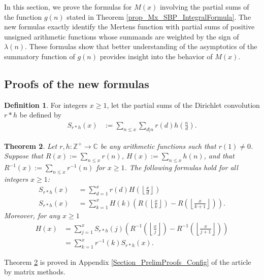 \documentclass[11pt,reqno,a4letter]{article}
\newcommand{\hlocalref}[1]{\hyperref[#1]{\ref{#1}}}
\numberwithin{equation}{section}
\numberwithin{figure}{section}
\numberwithin{table}{section}
\newcommand{\Floor}[2]{\ensuremath{\left\lfloor \frac{#1}{#2} \right\rfloor}}
\theoremstyle{plain}
\newtheorem{theorem}{Theorem}
\numberwithin{theorem}{section}
\theoremstyle{definition}
\newtheorem{definition}[theorem]{Definition}
\begin{document}
In this section, we prove the formulas for $M(x)$ involving the partial sums 
of the function $g(n)$ stated in 
Theorem \hlocalref{prop_Mx_SBP_IntegralFormula}. 
The new formulas exactly identify the Mertens function with partial sums of 
positive unsigned arithmetic functions whose summands are 
weighted by the sign of $\lambda(n)$. 
These formulas show that better understanding of the 
asymptotics of the summatory function of $g(n)$ 
provides insight into the behavior of $M(x)$. 

\subsection{Proofs of the new formulas} 
\label{subSection_KeyApplications_NewExactFormulasForMx} 

\begin{definition}
For integers $x \geq 1$, let the partial sums of the 
Dirichlet convolution $r \ast h$ be defined by 
\begin{align*} 
S_{r \ast h}(x) & := \sum_{n \leq x} \sum_{d|n} r(d) h\left(\frac{n}{d}\right). 
\end{align*}
\end{definition}

\begin{theorem} 
\label{theorem_SummatoryFuncsOfDirCvls} 
Let $r,h: \mathbb{Z}^{+} \rightarrow \mathbb{C}$ be any 
arithmetic functions such that $r(1) \neq 0$. 
Suppose that $R(x) := \sum_{n \leq x} r(n)$, $H(x) := \sum_{n \leq x} h(n)$, and that 
$R^{-1}(x) := \sum_{n \leq x} r^{-1}(n)$ for $x \geq 1$. 
The following formulas hold for all integers $x \geq 1$: 
\begin{align*} 
S_{r \ast h}(x) & \phantom{:}= \sum_{d=1}^x r(d) H\left(\Floor{x}{d}\right) \\ 
S_{r \ast h}(x) & \phantom{:}= \sum_{k=1}^{x} H(k) \left(R\left(\Floor{x}{k}\right) - 
     R\left(\Floor{x}{k+1}\right)\right). 
\end{align*} 
Moreover, for any $x \geq 1$ 
\begin{align*} 
H(x) & = \sum_{j=1}^{x} S_{r \ast h}(j) \left(R^{-1}\left(\Floor{x}{j}\right) - 
     R^{-1}\left(\Floor{x}{j+1}\right)\right) \\ 
     & = \sum_{k=1}^{x} r^{-1}(k) S_{r \ast h}(x). 
\end{align*} 
\end{theorem} 

Theorem \hlocalref{theorem_SummatoryFuncsOfDirCvls} 
is proved in Appendix \hlocalref{Section_PrelimProofs_Config} 
of the article by matrix methods. 
\end{document}
